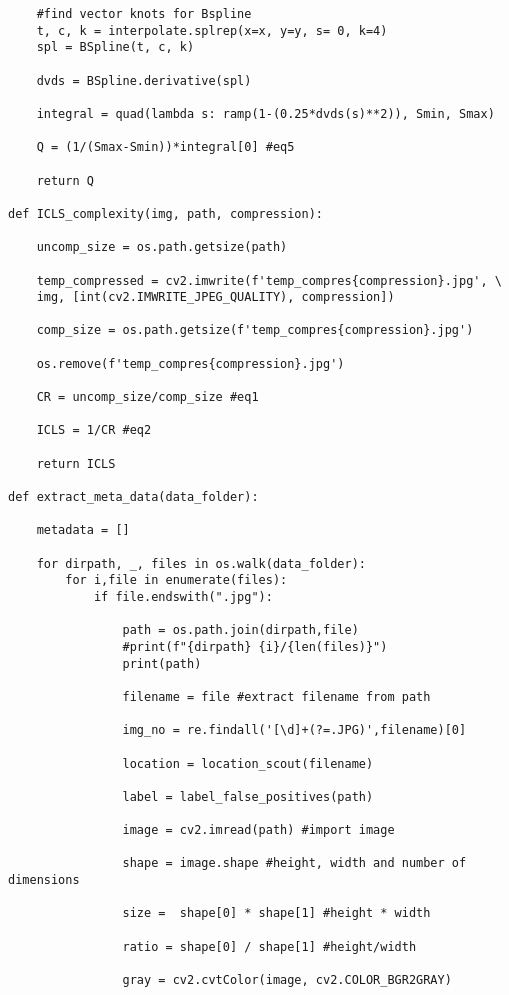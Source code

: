 \documentclass[12pt]{article}
\begin{document}
\begin{verbatim}
    #find vector knots for Bspline
    t, c, k = interpolate.splrep(x=x, y=y, s= 0, k=4)
    spl = BSpline(t, c, k)
    
    dvds = BSpline.derivative(spl)

    integral = quad(lambda s: ramp(1-(0.25*dvds(s)**2)), Smin, Smax)

    Q = (1/(Smax-Smin))*integral[0] #eq5   

    return Q

def ICLS_complexity(img, path, compression):

    uncomp_size = os.path.getsize(path)

	temp_compressed = cv2.imwrite(f'temp_compres{compression}.jpg', \
	img, [int(cv2.IMWRITE_JPEG_QUALITY), compression])

    comp_size = os.path.getsize(f'temp_compres{compression}.jpg')

    os.remove(f'temp_compres{compression}.jpg')

    CR = uncomp_size/comp_size #eq1

    ICLS = 1/CR #eq2

    return ICLS

def extract_meta_data(data_folder):

    metadata = []

    for dirpath, _, files in os.walk(data_folder):
        for i,file in enumerate(files): 
            if file.endswith(".jpg"):

                path = os.path.join(dirpath,file)
                #print(f"{dirpath} {i}/{len(files)}")
                print(path)

                filename = file #extract filename from path

                img_no = re.findall('[\d]+(?=.JPG)',filename)[0] 

                location = location_scout(filename)

                label = label_false_positives(path)
                
                image = cv2.imread(path) #import image

                shape = image.shape #height, width and number of dimensions

                size =  shape[0] * shape[1] #height * width

                ratio = shape[0] / shape[1] #height/width

                gray = cv2.cvtColor(image, cv2.COLOR_BGR2GRAY)


\end{verbatim}
\end{document}
